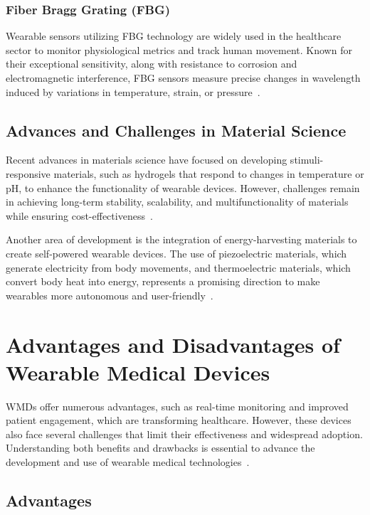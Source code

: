 \documentclass[journal]{IEEEtran}
\begin{document}
        \subsubsection{Fiber Bragg Grating (FBG)}

        Wearable sensors utilizing FBG technology are widely used in the healthcare sector to monitor physiological metrics and track human movement. Known for their exceptional sensitivity, along with resistance to corrosion and electromagnetic interference, FBG sensors measure precise changes in wavelength induced by variations in temperature, strain, or pressure~\cite{Song2025}. 


    \subsection{Advances and Challenges in Material Science}

    Recent advances in materials science have focused on developing stimuli-responsive materials, such as hydrogels that respond to changes in temperature or pH, to enhance the functionality of wearable devices. However, challenges remain in achieving long-term stability, scalability, and multifunctionality of materials while ensuring cost-effectiveness~\cite{Trovato2022}.

    Another area of development is the integration of energy-harvesting materials to create self-powered wearable devices. The use of piezoelectric materials, which generate electricity from body movements, and thermoelectric materials, which convert body heat into energy, represents a promising direction to make wearables more autonomous and user-friendly~\cite{Pantrangi2024}.

\section{Advantages and Disadvantages of Wearable Medical Devices}
\label{7.Advantages}

WMDs offer numerous advantages, such as real-time monitoring and improved patient engagement, which are transforming healthcare. However, these devices also face several challenges that limit their effectiveness and widespread adoption. Understanding both benefits and drawbacks is essential to advance the development and use of wearable medical technologies~\cite{Dias2018,Iqbal2016,Ha2018}.

    \subsection{Advantages}
\end{document}
